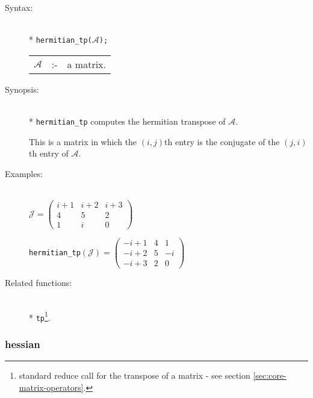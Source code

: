 \begin{description}
\item[Syntax:]\mbox{}\\*
\texttt{hermitian\_tp($\mathcal{A}$);}\\[2mm]
\begin{tabular}{l l l}
$\mathcal{A}$ &:-& a matrix.
\end{tabular}

\item[Synopsis:]\mbox{}\\*
         \texttt{hermitian\_tp} computes the hermitian transpose of $\mathcal{A}$.

This is a matrix in which the $(i,j)$th entry is the conjugate of the $(j,i)$th
entry of $\mathcal{A}$.

\item[Examples:]\mbox{}\\
  \(\mathcal{J} = \begin{pmatrix} i+1 & i+2 & i+3 \\ 4 & 5 & 2 \\ 1 &
    i & 0 \end{pmatrix}\)

  \texttt{hermitian\_tp}\((\mathcal{J})  =
  \begin{pmatrix} -i+1 & 4 & 1 \\ -i+2 & 5 & -i \\-i+3 & 2 & 0 \end{pmatrix}\)

\item[Related functions:]\mbox{}\\*
\texttt{tp}\footnote{standard reduce call for the
transpose of a matrix - see section \protect\ref{sec:core-matrix-operators}.}.
\end{description}


\subsubsection{hessian}
\label{linalg:hessian}

